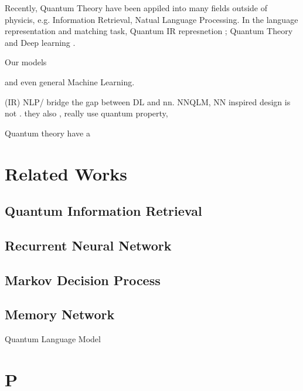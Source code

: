 \documentclass{sig-alternate-05-2015}
\begin{document}
Recently, Quantum Theory have been appiled into many fields outside of physicis, e.g. Information Retrieval\cite{van2004geometry,melucci2011quantum}, Natual Language Processing\cite{blacoe2013quantum,zhang2018end}. In the language representation and matching task, Quantum IR represnetion ;   Quantum Theory and Deep learning  .

Our models

and even general Machine Learning. \cite{levine2017deep}


(IR) NLP/ bridge the gap between DL and nn.  NNQLM, NN inspired design is not . they also ,  really use quantum property,

Quantum theory have a 

















\section{Related Works}
\subsection{Quantum Information Retrieval}
\subsection{Recurrent Neural Network}
\subsection{Markov Decision Process}
\subsection{Memory Network}
Quantum Language Model

\section{P}
\end{document}
